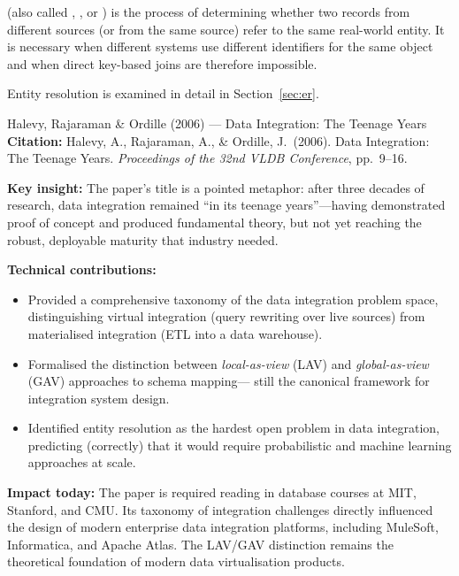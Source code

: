  (also called ,
, or ) is the process of
determining whether two records from different sources (or from the same
source) refer to the same real-world entity. It is necessary when
different systems use different identifiers for the same object and when
direct key-based joins are therefore impossible.

Entity resolution is examined in detail in Section~\ref{sec:er}.

\begin{researchspotlight}{Halevy, Rajaraman \& Ordille (2006) --- Data Integration: The Teenage Years}
\textbf{Citation:} Halevy, A., Rajaraman, A., \& Ordille, J.\ (2006).
Data Integration: The Teenage Years. \textit{Proceedings of the 32nd
VLDB Conference}, pp.\ 9--16. \parencite{Halevy2006}

\smallskip\noindent
\textbf{Key insight:} The paper's title is a pointed metaphor: after
three decades of research, data integration remained ``in its teenage
years''---having demonstrated proof of concept and produced fundamental
theory, but not yet reaching the robust, deployable maturity that
industry needed.

\smallskip\noindent
\textbf{Technical contributions:}
\begin{itemize}
  \item Provided a comprehensive taxonomy of the data integration
        problem space, distinguishing virtual integration (query
        rewriting over live sources) from materialised integration
        (ETL into a data warehouse).
  \item Formalised the distinction between \emph{local-as-view} (LAV)
        and \emph{global-as-view} (GAV) approaches to schema mapping---
        still the canonical framework for integration system design.
  \item Identified entity resolution as the hardest open problem in
        data integration, predicting (correctly) that it would require
        probabilistic and machine learning approaches at scale.
\end{itemize}

\smallskip\noindent
\textbf{Impact today:} The paper is required reading in database
courses at MIT, Stanford, and CMU. Its taxonomy of integration
challenges directly influenced the design of modern enterprise data
integration platforms, including MuleSoft, Informatica, and Apache
Atlas. The LAV/GAV distinction remains the theoretical foundation of
modern data virtualisation products.
\end{researchspotlight}

